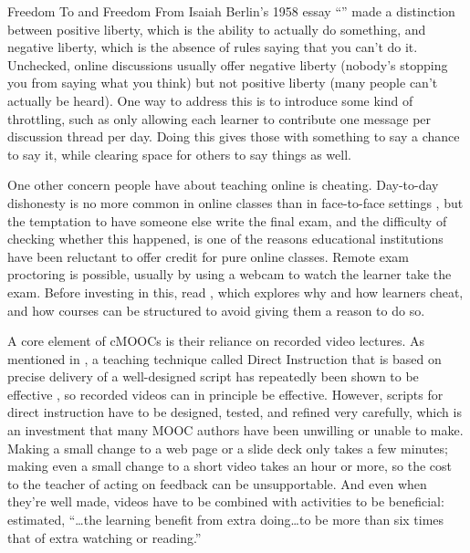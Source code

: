 \begin{aside}{Freedom To and Freedom From}
  Isaiah Berlin's 1958 essay ``'' made a distinction between positive
  liberty, which is the ability to actually do something, and negative
  liberty, which is the absence of rules saying that you can't do
  it. Unchecked, online discussions usually offer negative liberty
  (nobody's stopping you from saying what you think) but not positive
  liberty (many people can't actually be heard). One way to address
  this is to introduce some kind of throttling, such as only allowing
  each learner to contribute one message per discussion thread per
  day. Doing this gives those with something to say a chance to say
  it, while clearing space for others to say things as well.
\end{aside}

One other concern people have about teaching online is cheating.
Day-to-day dishonesty is no more common in online classes than in
face-to-face settings \cite{Beck2014}, but the temptation to have
someone else write the final exam, and the difficulty of checking
whether this happened, is one of the reasons educational institutions
have been reluctant to offer credit for pure online classes. Remote exam
proctoring is possible, usually by using a webcam to watch the learner
take the exam. Before investing in this, read \cite{Lang2013}, which
explores why and how learners cheat, and how courses can be structured
to avoid giving them a reason to do so.


A core element of cMOOCs is their reliance on recorded video lectures.
As mentioned in , a teaching technique called
Direct Instruction that is based on precise delivery of a well-designed
script has repeatedly been shown to be effective \cite{Stoc2018}, so
recorded videos can in principle be effective. However, scripts for
direct instruction have to be designed, tested, and refined very
carefully, which is an investment that many MOOC authors have been
unwilling or unable to make. Making a small change to a web page or a
slide deck only takes a few minutes; making even a small change to a
short video takes an hour or more, so the cost to the teacher of acting
on feedback can be unsupportable. And even when they're well made,
videos have to be combined with activities to be beneficial:
\cite{Koed2015} estimated, ``{\ldots}the learning benefit from
extra doing{\ldots}to be more than six times that of extra
watching or reading.''

